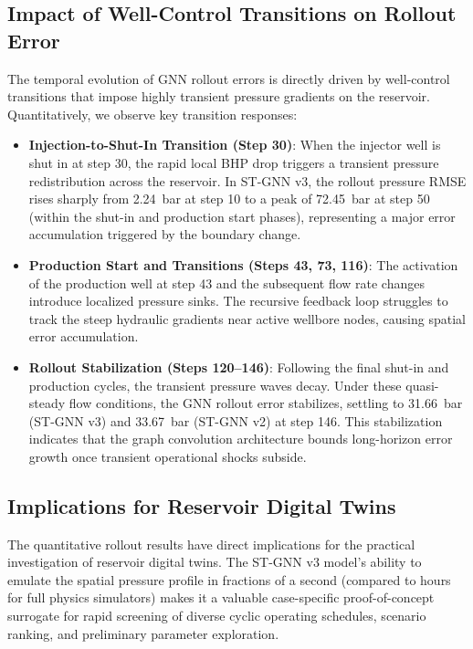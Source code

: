 \subsection{Impact of Well-Control Transitions on Rollout Error}
The temporal evolution of GNN rollout errors is directly driven by well-control transitions that impose highly transient pressure gradients on the reservoir. Quantitatively, we observe key transition responses:
\begin{itemize}
    \item \textbf{Injection-to-Shut-In Transition (Step 30)}: When the injector well is shut in at step 30, the rapid local BHP drop triggers a transient pressure redistribution across the reservoir. In ST-GNN v3, the rollout pressure RMSE rises sharply from 2.24~bar at step 10 to a peak of 72.45~bar at step 50 (within the shut-in and production start phases), representing a major error accumulation triggered by the boundary change.
    \item \textbf{Production Start and Transitions (Steps 43, 73, 116)}: The activation of the production well at step 43 and the subsequent flow rate changes introduce localized pressure sinks. The recursive feedback loop struggles to track the steep hydraulic gradients near active wellbore nodes, causing spatial error accumulation.
    \item \textbf{Rollout Stabilization (Steps 120--146)}: Following the final shut-in and production cycles, the transient pressure waves decay. Under these quasi-steady flow conditions, the GNN rollout error stabilizes, settling to 31.66~bar (ST-GNN v3) and 33.67~bar (ST-GNN v2) at step 146. This stabilization indicates that the graph convolution architecture bounds long-horizon error growth once transient operational shocks subside.
\end{itemize}

\subsection{Implications for Reservoir Digital Twins}
The quantitative rollout results have direct implications for the practical investigation of reservoir digital twins. The ST-GNN v3 model's ability to emulate the spatial pressure profile in fractions of a second (compared to hours for full physics simulators) makes it a valuable case-specific proof-of-concept surrogate for rapid screening of diverse cyclic operating schedules, scenario ranking, and preliminary parameter exploration.

